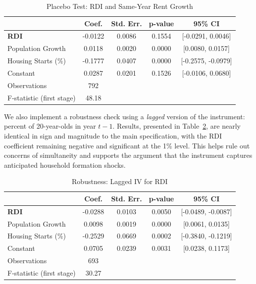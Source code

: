 \documentclass[APA,Times1COL]{WileyNJDv5} %
\begin{document}
\begin{table}[hbt!]
	\centering
	\caption{Placebo Test: RDI and Same-Year Rent Growth}
	\label{tab:placebo}
	\begin{tabular}{lcccc}
		\toprule
		& Coef. & Std. Err. & p-value & 95\% CI \\
		\midrule
		\textbf{RDI} & -0.0122 & 0.0086 & 0.1554 & [-0.0291, 0.0046] \\
		Population Growth & 0.0118 & 0.0020 & 0.0000 & [0.0080, 0.0157] \\
		Housing Starts (\%) & -0.1777 & 0.0407 & 0.0000 & [-0.2575, -0.0979] \\
		Constant & 0.0287 & 0.0201 & 0.1526 & [-0.0106, 0.0680] \\
		\midrule
		Observations & 792 &  &  &  \\
		F-statistic (first stage) & 48.18 & & & \\
		\bottomrule
	\end{tabular}
\end{table}

We also implement a robustness check using a \emph{lagged} version of the instrument: percent of 20-year-olds in year $t-1$. Results, presented in Table~\ref{tab:lagged}, are nearly identical in sign and magnitude to the main specification, with the RDI coefficient remaining negative and significant at the 1\% level. This helps rule out concerns of simultaneity and supports the argument that the instrument captures anticipated household formation shocks.

\begin{table}[hbt!]
	\centering
	\caption{Robustness: Lagged IV for RDI}
	\label{tab:lagged}
	\begin{tabular}{lcccc}
		\toprule
		& Coef. & Std. Err. & p-value & 95\% CI \\
		\midrule
		\textbf{RDI} & -0.0288 & 0.0103 & 0.0050 & [-0.0489, -0.0087] \\
		Population Growth & 0.0098 & 0.0019 & 0.0000 & [0.0061, 0.0135] \\
		Housing Starts (\%) & -0.2529 & 0.0669 & 0.0002 & [-0.3840, -0.1219] \\
		Constant & 0.0705 & 0.0239 & 0.0031 & [0.0238, 0.1173] \\
		\midrule
		Observations & 693 &  &  &  \\
		F-statistic (first stage) & 30.27 & & & \\
		\bottomrule
	\end{tabular}
\end{table}
\end{document}
